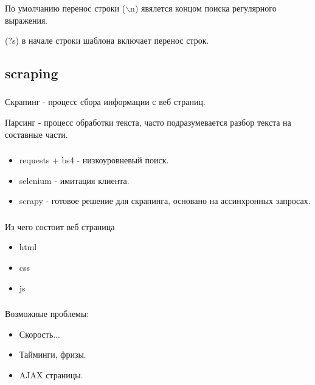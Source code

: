 \documentclass[t, 11pt]{beamer}
\begin{document}
\begin{frame}
	\frametitle{\insertsection}
	\frametitle{\insertsubsection}  
По умолчанию перенос строки ($\backslash$n) явялется концом поиска регулярного выражения.	

	\vspace{1cm}
(?s) в начале строки шаблона включает перенос строк.

\end{frame}

\subsection{scraping}
\begin{frame}
	\frametitle{\insertsection}
	\frametitle{\insertsubsection}  
	Скрапинг - процесс сбора информации с веб страниц.
	
	\vspace{1cm}
	
	Парсинг - процесс обработки текста, часто подразумевается разбор текста на составные части.  	
	
	
\end{frame}

\begin{frame}
	\frametitle{\insertsection}
	\frametitle{\insertsubsection}  
\begin{itemize}
	\item requests + bs4 - низкоуровневый поиск.
	\item selenium - имитация клиента.
	\item scrapy - готовое решение для скрапинга, основано на ассинхронных запросах.
	\end{itemize}  	
\end{frame}

\begin{frame}
	\frametitle{\insertsection}
	\frametitle{\insertsubsection}  
	Из чего состоит веб страница
	\begin{itemize}
		\item html 
		\item css
		\item js
	\end{itemize}  	
\end{frame}
\begin{frame}
	\frametitle{\insertsection}
	\frametitle{\insertsubsection}  
   Возможные проблемы:
	\begin{itemize}
		\item Скорость... 
		\item Тайминги, фризы.
		\item AJAX страницы.
	\end{itemize}  	
\end{frame}
\end{document}
